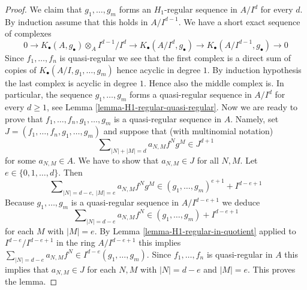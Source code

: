 \documentclass[10pt,a4paper]{amsart}
\theoremstyle{plain}
\theoremstyle{definition}
\theoremstyle{remark}
\numberwithin{equation}{subsection}
\begin{document}
\begin{proof}
We claim that $g_1, \ldots, g_m$ forms an $H_1$-regular sequence in
$A/I^d$ for every $d$. By induction assume that this holds in
$A/I^{d - 1}$. We have a short exact sequence of complexes
$$
0 \to K_\bullet(A, g_\bullet) \otimes_A I^{d - 1}/I^d
\to K_\bullet(A/I^d, g_\bullet) \to
K_\bullet(A/I^{d - 1}, g_\bullet) \to 0
$$
Since $f_1, \ldots, f_n$ is quasi-regular we see that the first complex
is a direct sum of copies of $K_\bullet(A/I, g_1, \ldots, g_m)$
hence acyclic in degree $1$. By induction hypothesis the last complex is
acyclic in degree $1$. Hence also the middle complex is.
In particular, the sequence $g_1, \ldots, g_m$ forms a quasi-regular
sequence in $A/I^d$ for every $d \geq 1$, see
Lemma \ref{lemma-H1-regular-quasi-regular}.
Now we are ready to prove that $f_1, \ldots, f_n, g_1, \ldots, g_m$
is a quasi-regular sequence in $A$.
Namely, set $J = (f_1, \ldots, f_n, g_1, \ldots, g_m)$ and suppose
that (with multinomial notation)
$$
\sum\nolimits_{|N| + |M| = d} a_{N, M} f^N g^M \in J^{d + 1}
$$
for some $a_{N, M} \in A$. We have to show that $a_{N, M} \in J$
for all $N, M$. Let $e \in \{0, 1, \ldots, d\}$. Then
$$
\sum\nolimits_{|N| = d - e, \ |M| = e} a_{N, M} f^N g^M \in
(g_1, \ldots, g_m)^{e + 1} + I^{d - e + 1}
$$
Because $g_1, \ldots, g_m$ is a quasi-regular sequence in $A/I^{d - e + 1}$
we deduce
$$
\sum\nolimits_{|N| = d - e} a_{N, M} f^N \in
(g_1, \ldots, g_m) + I^{d - e + 1}
$$
for each $M$ with $|M| = e$. By
Lemma \ref{lemma-H1-regular-in-quotient}
applied to $I^{d - e}/I^{d - e + 1}$ in the ring $A/I^{d - e + 1}$
this implies $\sum_{|N| = d - e} a_{N, M} f^N \in I^{d - e}(g_1, \ldots, g_m)$.
Since $f_1, \ldots, f_n$ is quasi-regular in $A$ this implies
that $a_{N, M} \in J$ for each $N, M$ with $|N| = d - e$ and $|M| = e$.
This proves the lemma.
\end{proof}
\end{document}
